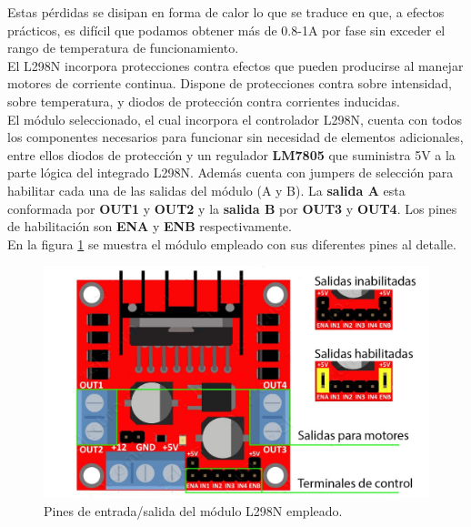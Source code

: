 Estas pérdidas se disipan en forma de calor lo que se traduce en que, a efectos prácticos, es difícil que podamos obtener más de 0.8-1A por fase sin exceder el rango de temperatura de funcionamiento.\\

El L298N incorpora protecciones contra efectos que pueden producirse al manejar motores de corriente continua. Dispone de protecciones contra sobre intensidad, sobre temperatura, y diodos de protección
contra corrientes inducidas.\\

El módulo seleccionado, el cual incorpora el controlador L298N, cuenta con todos los componentes necesarios para funcionar sin necesidad de elementos adicionales, entre ellos diodos de protección
y un regulador \textbf{LM7805} que suministra 5V a la parte lógica del integrado L298N. Además cuenta con jumpers de selección para habilitar cada una de las salidas del módulo (A y B).
La \textbf{salida A} esta conformada por \textbf{OUT1} y \textbf{OUT2} y la \textbf{salida B} por \textbf{OUT3} y \textbf{OUT4}. Los pines de habilitación son \textbf{ENA} y \textbf{ENB} respectivamente.\\

En la figura \ref{diagrama:L298N-salidas} se muestra el módulo empleado con sus diferentes pines al detalle.\\

\begin{figure}[H]
  \begin{center}
    \includegraphics[scale=2]{imagenes/L298N-conexiones.jpg}
  \end{center}
  \caption{Pines de entrada/salida del módulo L298N empleado.}
  \label{diagrama:L298N-salidas}
\end{figure}


